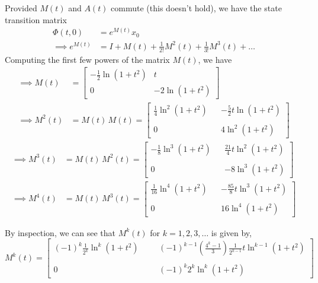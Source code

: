 \vspace*{3em}
Provided \( M(t) \) and \( A(t) \) commute
(this doesn't hold), we have the state transition matrix
\begin{align*}
    \Phi(t, 0)
     & =
    e^{M(t)} x_0
    \\
    \implies
    e^{M(t)}
     & =
    I + M(t) + \frac{1}{2!} M^2(t) + \frac{1}{3!} M^3(t) + \ldots
\end{align*}
Computing the first few powers of the matrix \( M(t) \), we have
\begin{align*}
    \implies
    M(t)
     & =
    \begin{bmatrix}
        -\frac{1}{2} \ln(1+t^2)
         &
        t
        \\
        0
         &
        -2 \ln(1+t^2)
    \end{bmatrix}
    \\
    \implies
    M^2(t)
     & =
    M(t) \, M(t)
    =
    \begin{bmatrix}
        \frac{1}{4} \ln^2(1+t^2)
         &  &
        -\frac{5}{2} t \ln(1+t^2)
        \\ \\
        0
         &  &
        4 \ln^2(1+t^2)
    \end{bmatrix}
\end{align*}
\begin{align*}
    \implies
    M^3(t)
     & =
    M(t) \, M^2(t)
    =
    \begin{bmatrix}
        -\frac{1}{8} \ln^3(1+t^2)
         &  &
        \frac{21}{4} t \ln^2(1+t^2)
        \\ \\
        0
         &  &
        -8 \ln^3(1+t^2)
    \end{bmatrix}
    \\
    \implies
    M^4(t)
     & =
    M(t) \, M^3(t)
    =
    \begin{bmatrix}
        \frac{1}{16} \ln^4(1+t^2)
         &  &
        -\frac{85}{8} t \ln^3(1+t^2)
        \\ \\
        0
         &  &
        16 \ln^4(1+t^2)
    \end{bmatrix}
\end{align*}

By inspection, we can see that \( M^{k} (t) \) for \( k = 1, 2, 3, \ldots \) is given by,
\begin{equation*}
    M^{k} (t)
    =
    \begin{bmatrix}
        \displaystyle
        {(-1)}^{k} \frac{1}{2^k} \ln^{k}(1+t^2)
         &  &  &
        \displaystyle
        {(-1)}^{k-1} \left( \frac{4^k-1}{3} \right) \frac{1}{2^{k-1}} t \ln^{k-1}(1+t^2)
        \\ \\
        0
         &  &  &
        \displaystyle
        {(-1)}^{k} 2^{k} \ln^{k}(1+t^2)
    \end{bmatrix}
\end{equation*}

